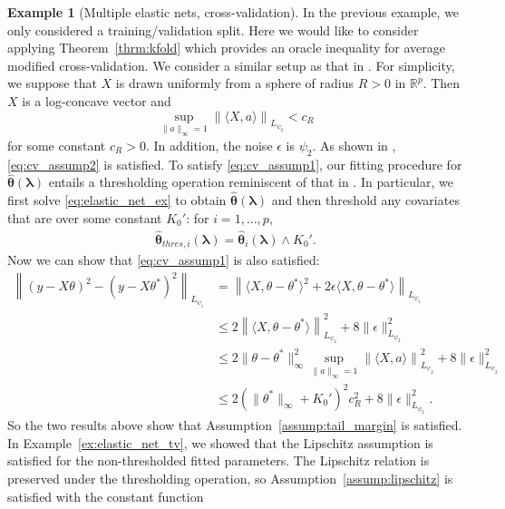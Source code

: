 \documentclass[12pt]{article} %
\theoremstyle{definition}
\newtheorem{example}{Example}
\begin{document}
\begin{example}[Multiple elastic nets, cross-validation]
	In the previous example, we only considered a training/validation split.
	Here we would like to consider applying Theorem~\ref{thrm:kfold} which provides an oracle inequality for average modified cross-validation.
	We consider a similar setup as that in \citet{lecue2012oracle}.
	For simplicity, we suppose that $X$ is drawn uniformly from a sphere of radius $R > 0$ in $\mathbb{R}^p$.
	Then $X$ is a log-concave vector and
	$$
	\sup_{\|a\|_\infty = 1} \left\| \langle X, a \rangle \right \|_{L_{\psi_2}} < c_R
	$$
	for some constant $c_R > 0$.
	In addition, the noise $\epsilon$ is $\psi_2$.
	As shown in \citet{lecue2012oracle}, \eqref{eq:cv_assump2} is satisfied.
	To satisfy \eqref{eq:cv_assump1}, our fitting procedure for $\hat{\boldsymbol{\theta}}(\boldsymbol{\lambda})$ entails a thresholding operation reminiscent of that in \citet{lecue2012oracle}.
	In particular, we first solve \eqref{eq:elastic_net_ex} to obtain $\hat{\boldsymbol{\theta}}(\boldsymbol{\lambda})$ and then threshold any covariates that are over some constant $K_0'$: for $i = 1,...,p$,
	\begin{align}
	\hat{\boldsymbol{\theta}}_{thres, i}(\boldsymbol{\lambda})
	= \hat{\boldsymbol{\theta}}_{i}(\boldsymbol{\lambda}) \wedge K_0'.
	\end{align}
	Now we can show that \eqref{eq:cv_assump1} is also satisfied:
	\begin{align}
	\left \|
	\left(
	y - X\theta
	\right)^2
	- \left(
	y - X\theta^*
	\right)^2 \right \|_{L_{\psi_1}}
	& =
	\left \|
	\langle X, \theta - \theta^* \rangle^2
	+ 2\epsilon \langle X, \theta - \theta^* \rangle
	\right \|_{L_{\psi_1}}\\
	&
	\le
	2 \left\| \langle X, \theta - \theta^* \rangle \right \|_{L_{\psi_2}}^2
	+ 8 \|\epsilon\|_{L_{\psi_2}}^2\\
	&
	\le
	2 \|\theta - \theta^*\|_\infty^2
	\sup_{\|a\|_\infty = 1} \left\| \langle X, a \rangle \right \|_{L_{\psi_2}}^2
	+ 8 \|\epsilon\|_{L_{\psi_2}}^2\\
	& \le 2
	(\|\theta^*\|_\infty + K_0')^2 c_R^2
	+ 8 \|\epsilon\|_{L_{\psi_2}}^2.
	\end{align}
	So the two results above show that Assumption~\ref{assump:tail_margin} is satisfied.
	In Example~\ref{ex:elastic_net_tv}, we showed that the Lipschitz assumption is satisfied for the non-thresholded fitted parameters.
	The Lipschitz relation is preserved under the thresholding operation, so Assumption~\ref{assump:lipschitz} is satisfied with the constant function

\end{example}
\end{document}
